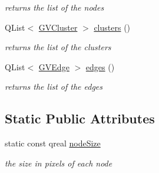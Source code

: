 \begin{DoxyCompactItemize}
\begin{DoxyCompactList}\small\item\em returns the list of the nodes \end{DoxyCompactList}\item 
\hypertarget{class_g_v_sub_graph_a52594db2f31cfb221820cbd48b6d3530}{\-Q\-List$<$ \hyperlink{struct_g_v_cluster}{\-G\-V\-Cluster} $>$ \hyperlink{class_g_v_sub_graph_a52594db2f31cfb221820cbd48b6d3530}{clusters} ()}\label{class_g_v_sub_graph_a52594db2f31cfb221820cbd48b6d3530}

\begin{DoxyCompactList}\small\item\em returns the list of the clusters \end{DoxyCompactList}\item 
\hypertarget{class_g_v_sub_graph_a88469fa80e33d2506cde3b6352c3c508}{\-Q\-List$<$ \hyperlink{struct_g_v_edge}{\-G\-V\-Edge} $>$ \hyperlink{class_g_v_sub_graph_a88469fa80e33d2506cde3b6352c3c508}{edges} ()}\label{class_g_v_sub_graph_a88469fa80e33d2506cde3b6352c3c508}

\begin{DoxyCompactList}\small\item\em returns the list of the edges \end{DoxyCompactList}\end{DoxyCompactItemize}
\subsection*{\-Static \-Public \-Attributes}
\begin{DoxyCompactItemize}
\item 
\hypertarget{class_g_v_sub_graph_acad7d627217c64966125e7701142c40b}{static const qreal \hyperlink{class_g_v_sub_graph_acad7d627217c64966125e7701142c40b}{node\-Size}}\label{class_g_v_sub_graph_acad7d627217c64966125e7701142c40b}

\begin{DoxyCompactList}\small\item\em the size in pixels of each node \end{DoxyCompactList}\end{DoxyCompactItemize}
